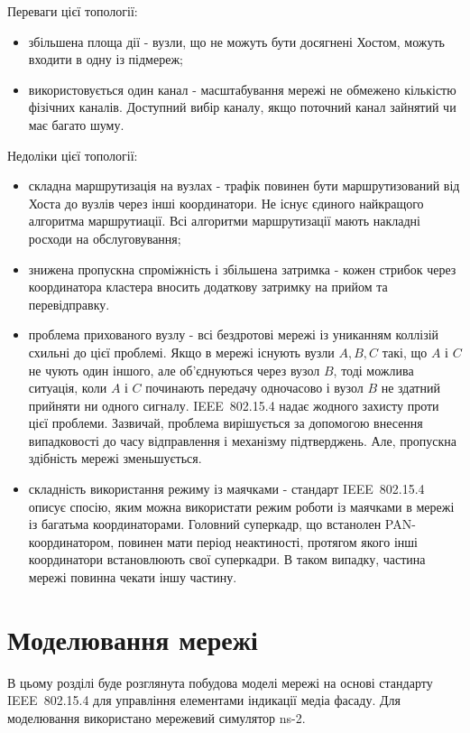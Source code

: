 \documentclass[a4paper,ukrainian,utf8,nocolumnsxix,floatsection,equationsection]{eskdtext}
\let\stdsection\section
\renewcommand\section{\clearpage\stdsection}
\newcommand{\iee}[0]{IEEE~802.15.4\xspace}
\begin{document}
Переваги цієї топології:
\begin{itemize}
	\item збільшена площа дії - вузли, що не можуть бути досягнені Хостом, можуть входити в одну із підмереж;
	\item використовується один канал - масштабування мережі не обмежено кількістю фізічних каналів. Доступний вибір каналу, якщо поточний канал зайнятий чи має багато шуму.
\end{itemize}

Недоліки цієї топології:
\begin{itemize}
	\item складна маршрутизація на вузлах - трафік повинен бути маршрутизований від Хоста до вузлів через інші координатори. Не існує єдиного найкращого алгоритма маршрутиації. Всі алгоритми маршрутизації мають накладні росходи на обслуговування;
	\item знижена пропускна спроміжність і збільшена затримка - кожен стрибок через координатора кластера вносить додаткову затримку на прийом та перевідправку. 
	\item проблема прихованого вузлу - всі бездротові мережі із униканням коллізій схильні до цієї проблемі. Якщо в мережі існують вузли $A,B,C$ такі, що $A$ і $C$ не чують один іншого, але об’єднуються через вузол $B$, тоді можлива ситуація, коли $A$ і $C$ починають передачу одночасово і вузол $B$ не здатний прийняти ни одного сигналу. \iee надає жодного захисту проти цієї проблеми. Зазвичай, проблема вирішується за допомогою внесення випадковості до часу відправлення і механізму підтверджень. Але, пропускна здібність мережі зменьшується.
	\item складність використання режиму із маячками - стандарт \iee описує спосію, яким можна використати режим роботи із маячками в мережі із багатьма координаторами. Головний суперкадр, що встанолен PAN-координатором, повинен мати період неактиності, протягом якого інші координатори встановлюють свої суперкадри. В таком випадку, частина мережі повинна чекати іншу частину.
\end{itemize}


\section{Моделювання мережі}
\label{sec:simulation}

В цьому розділі буде розглянута побудова моделі мережі на основі стандарту \iee для управління елементами індикації медіа фасаду. Для моделювання використано мережевий симулятор ns-2.
\end{document}
